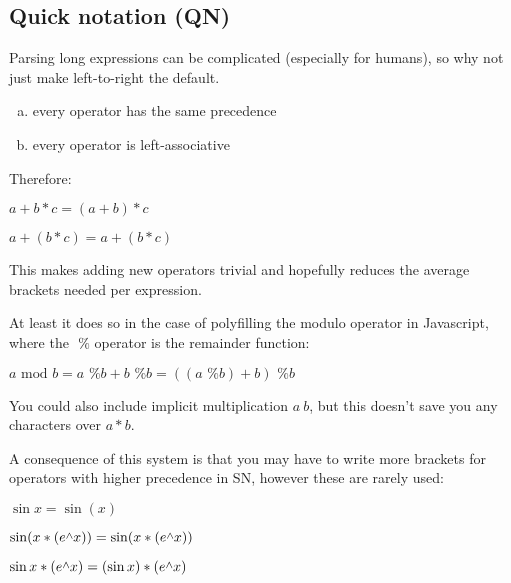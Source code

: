 \documentclass[twoside]{article}
\newcommand{\T}[1]{\textrm{#1}} %
\newcommand{\caret}{\raisebox{0.5ex}{$\scriptstyle\wedge$}}
\newcommand{\percent}{\T{ \% }}
\begin{document}
\begin{multicols*}{2}
        \section{Quick notation (QN)}
            Parsing long expressions can be complicated (especially for humans),
            so why not just make left-to-right the default.
            \begin{enumerate}[a)]
                \item every operator has the same precedence
                \item every operator is left-associative
            \end{enumerate}
            \par\vspace{2px}
                Therefore:\vspace{2px}\\
                \centerline{$ a + b * c = (a + b) * c $}
                \centerline{$ a + (b * c) = a + (b * c) $}\vspace{-1px}
            \par\vspace{5px}
                This makes adding new operators trivial
                and hopefully reduces the average brackets needed per expression.
                \par
                    At least it does so in the case of polyfilling the modulo operator in Javascript,
                    where the $\percent$ operator is the remainder function:\vspace{4px}\\
                \centerline{$ a \T{ mod } b = a \percent b + b \percent b = ((a \percent b) + b) \percent b $}
            \par\vspace{5px}
                You could also include implicit multiplication $a\ b$,
                but this doesn't save you any characters over $a*b$.
            \par\vspace{5px}
                A consequence of this system is that
                you may have to write more brackets for operators with higher precedence in SN,
                however these are rarely used:\vspace{2px}\\
                \centerline{$ \sin x = \sin(x) $}
                \centerline{$ \sin (x * (e \caret x)) = \sin(x * (e \caret x)) $}
                \centerline{$ \sin x * (e \caret x) = (\sin x) * (e \caret x) $}
    \end{multicols*}
\end{document}
